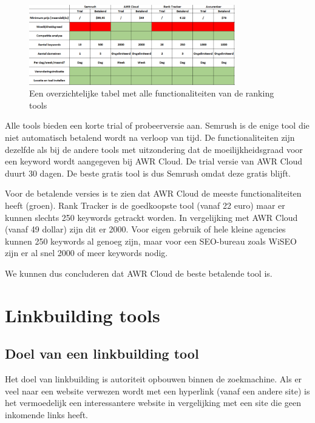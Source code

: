 \begin{figure}[h!]
\centering
\includegraphics[width=0.8\textwidth]{img/rankingtabel.PNG}
\caption{Een overzichtelijke tabel met alle functionaliteiten van de ranking tools}
\end{figure}

Alle tools bieden een korte trial of probeerversie aan. Semrush is de enige tool die niet automatisch betalend wordt na verloop van tijd. De functionaliteiten zijn dezelfde als bij de andere tools met uitzondering dat de moeilijkheidsgraad voor een keyword wordt aangegeven bij AWR Cloud. De trial versie van AWR Cloud duurt 30 dagen. De beste gratis tool is dus Semrush omdat deze gratis blijft. 

Voor de betalende versies is te zien dat AWR Cloud de meeste functionaliteiten heeft (groen). Rank Tracker is de goedkoopste tool (vanaf 22 euro) maar er kunnen slechts 250 keywords getrackt worden. In vergelijking met AWR Cloud (vanaf 49 dollar) zijn dit er 2000. Voor eigen gebruik of hele kleine agencies kunnen 250 keywords al genoeg zijn, maar voor een SEO-bureau zoals WiSEO zijn er al snel 2000 of meer keywords nodig. 

We kunnen dus concluderen dat AWR Cloud de beste betalende tool is. 

\section{Linkbuilding tools}
\label{ch: Linkbuilding tools}

\subsection{Doel van een linkbuilding tool}
\label{ch: Doel van een linkbuilding tool}

Het doel van linkbuilding is autoriteit opbouwen binnen de zoekmachine. Als er veel naar een website verwezen wordt met een hyperlink (vanaf een andere site) is het vermoedelijk een interessantere website in vergelijking met een site die geen inkomende links heeft. 

